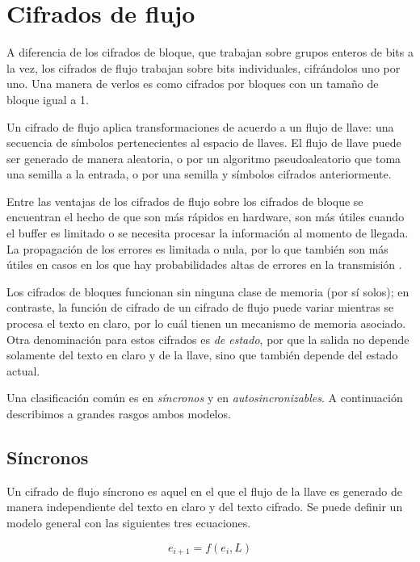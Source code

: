 %
%

\newpage
\section{Cifrados de flujo}

A diferencia de los cifrados de bloque, que trabajan sobre grupos enteros de
bits a la vez, los cifrados de flujo trabajan sobre bits individuales,
cifrándolos uno por uno. Una manera de verlos es como cifrados por bloques con
un tamaño de bloque igual a 1.

Un cifrado de flujo aplica transformaciones de acuerdo a un flujo de llave:
una secuencia de símbolos pertenecientes al espacio de llaves. El flujo de
llave puede ser generado de manera aleatoria, o por un algoritmo
pseudoaleatorio que toma una semilla a la entrada, o por una semilla y
símbolos cifrados anteriormente.

Entre las ventajas de los cifrados de flujo sobre los cifrados de bloque se
encuentran el hecho de que son más rápidos en hardware, son más útiles cuando
el buffer es limitado o se necesita procesar la información al momento de
llegada. La propagación de los errores es limitada o nula, por lo que también
son más útiles en casos en los que hay probabilidades altas de errores en la
transmisión \cite{menezes}.

Los cifrados de bloques funcionan sin ninguna clase de memoria (por sí solos);
en contraste, la función de cifrado de un cifrado de flujo puede variar
mientras se procesa el texto en claro, por lo cuál tienen un mecanismo de
memoria asociado. Otra denominación para estos cifrados es \textit{de estado},
por que la salida no depende solamente del texto en claro y de la llave, sino
que también depende del estado actual.

Una clasificación común es en \textit{síncronos} y
en \textit{autosincronizables}. A continuación describimos a grandes rasgos
ambos modelos.

\subsection{Síncronos}

Un cifrado de flujo síncrono es aquel en el que el flujo de la llave es
generado de manera independiente del texto en claro y del texto cifrado. Se
puede definir un modelo general con las siguientes tres ecuaciones.

\begin{equation}
  \label{cambio_de_estado}
  e_{i+1} = f(e_i, L)
\end{equation}

